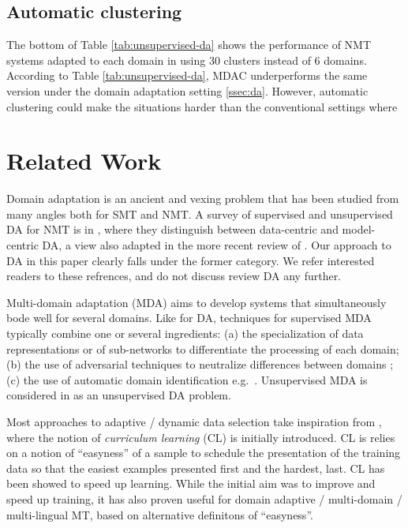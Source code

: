 \documentclass[11pt]{article}
\begin{document}
\subsection{Automatic clustering}\label{ssec:clda}
The bottom of Table \ref{tab:unsupervised-da} shows the performance of NMT systems adapted to each domain in using 30 clusters instead of 6 domains. According to Table \ref{tab:unsupervised-da}, MDAC underperforms the same version under the domain adaptation setting \ref{ssec:da}. However, automatic clustering could make the situations harder than the conventional settings where  
\section{Related Work \label{sec:related}}

Domain adaptation is an ancient and vexing problem that has been studied from many angles both for SMT and NMT. A survey of supervised and unsupervised DA for NMT is in \citet{Chu18asurvey}, where they distinguish between data-centric and model-centric DA, a view also adapted in the more recent review of \citet{Saunders21domain}. Our approach to DA in this paper clearly falls under the former category. We refer interested readers to these refrences, and do not discuss review DA any further.

Multi-domain adaptation (MDA) aims to develop systems that simultaneously bode well for several domains. Like for DA, techniques for supervised MDA typically combine one or several ingredients: (a) the specialization of data representations \citep{Kobus17domaincontrol} or of sub-networks \citep{Pham19generic} to differentiate the processing of each domain; (b) the use of adversarial techniques to neutralize differences between domains \cite{Britz17mixing,Zeng18multidomain}; (c) the use of automatic domain identification e.g.\ \citet{Jiang19multidomain}. Unsupervised MDA is considered in \citet{Farajian17multidomain} as an unsupervised DA problem.

Most approaches to adaptive / dynamic data selection take inspiration from \citet{Bengio09curriculum}, where the notion of \emph{curriculum learning} (CL) is initially introduced. CL is relies on a notion of ``easyness'' of a sample to schedule the presentation of the training data so that the easiest examples  presented first and the hardest, last. CL has been showed to speed up learning. While the initial aim was to improve and speed up training, it has also proven useful for domain adaptive / multi-domain / multi-lingual MT, based on alternative definitons of ``easyness''.
\end{document}
